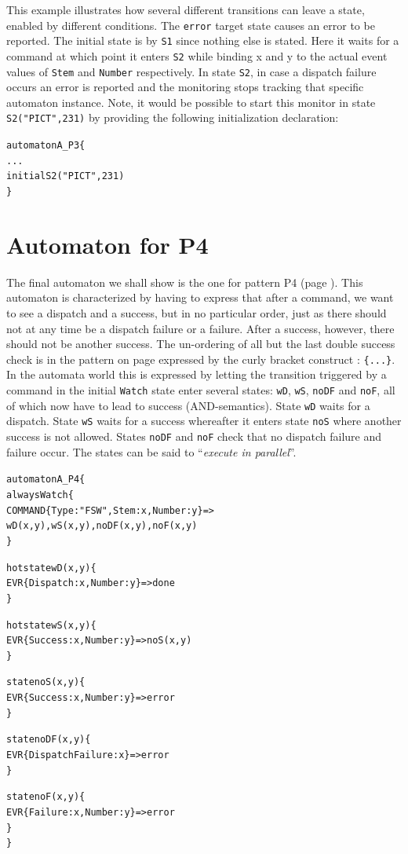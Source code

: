 \documentclass{report}
\newenvironment{code}[1] %
{
\vspace{0.5cm}
\begin{center}
\begin{Sbox}
\begin{minipage}{11cm}
\begin{alltt}
{\bf\em #1}
}
{
\end{alltt}
\end{minipage}
\end{Sbox}
\setlength{\fboxsep}{8pt}
\fbox{\TheSbox}
\end{center}
\vspace{0.5cm}
}
\begin{document}
\noindent This example illustrates how several different transitions can leave a state,
enabled by different conditions. The {\tt error} target state causes an error to be reported.
The initial state is by {\tt S1} since nothing else is stated. Here it waits for a command
at which point it enters {\tt S2} while binding x and y to the actual event values of {\tt Stem} and
{\tt Number} respectively. In state {\tt S2}, in case a dispatch failure occurs an error is reported
and the monitoring stops tracking that specific automaton instance. Note, it would be possible to start this monitor
in state {\tt S2("PICT",231)} by  providing the following initialization declaration:

\begin{code}{}
  automaton A_P3 \{
    ...
    initial S2("PICT",231)
  \}
\end{code}


\section{Automaton for P4}

The final automaton we shall show is the one for pattern P4 (page \pageref{pattern:p4}).
This automaton is characterized by having to express that after a command, we want to see
a dispatch and a success, but in no particular order,  just as there should not at any time be a dispatch
failure or a failure. After a success, however, there should not be another success. The un-ordering
of all but the last double success check is in the pattern on page \pageref{pattern:p4} 
expressed by the curly bracket construct : {\tt \{...\}}. In the automata world this is expressed by 
letting the transition  triggered by a command in the initial
{\tt Watch} state enter several states: {\tt wD}, {\tt wS}, {\tt noDF} and {\tt noF}, all of which now have to lead to
success (AND-semantics). State {\tt wD} waits for a dispatch. State {\tt wS} waits for a success whereafter it
enters state {\tt noS} where another success is not allowed. States {\tt noDF} and {\tt noF} check that no dispatch failure and failure occur. The states can be said to ``{\em execute in parallel}''.

\begin{code}{}
  automaton A_P4 \{
    always Watch \{
      COMMAND\{Type : "FSW",Stem : x,Number : y\} => 
           wD(x,y),wS(x,y),noDF(x,y),noF(x,y)
    \}

    hot state wD(x,y) \{
      EVR\{Dispatch : x,Number : y\} => done
    \}

    hot state wS(x,y) \{
      EVR\{Success : x,Number : y\} => noS(x,y)
    \}

    state noS(x,y) \{
      EVR\{Success : x,Number : y\} => error
    \}

    state noDF(x,y) \{
      EVR\{DispatchFailure : x\} => error
    \}

    state noF(x,y) \{
      EVR\{Failure : x,Number : y\} => error
    \}
  \}
\end{code}
\end{document}
